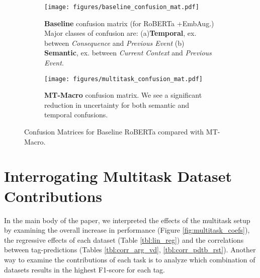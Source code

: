 \documentclass[11pt]{article}
\begin{document}
\begin{figure}[t]
\begin{subfigure}{.5\textwidth}
  \centering
  \texttt{[image: figures/baseline\_confusion\_mat.pdf]}
  \caption{\textbf{Baseline } confusion matrix (for RoBERTa +EmbAug.) Major classes of confusion are: (a)\textbf{Temporal}, ex. between \textit{Consequence} and \textit{Previous Event} (b) \textbf{Semantic}, ex. between \textit{Current Context} and \textit{Previous Event}.}
  \label{sfig:baseline_confusion_mat}
\end{subfigure}
\begin{subfigure}{.5\textwidth}
  \centering
  \texttt{[image: figures/multitask\_confusion\_mat.pdf]}
  \caption{\textbf{MT-Macro} confusion matrix. We see a significant reduction in uncertainty for both semantic and temporal confusions.}
  \label{sfig:multitask_confusion_mat}
\end{subfigure}
\caption{Confusion Matrices for Baseline RoBERTa compared with MT-Macro.}
\label{fig:fig}
\end{figure}

\section{Interrogating Multitask Dataset Contributions}
\label{app:multitask_dataset_contributions}

In the main body of the paper, we interpreted the effects of the multitask setup by examining the overall increase in performance (Figure \ref{fig:multitask_coefs}), the regressive effects of each dataset (Table \ref{tbl:lin_reg}) and the correlations between tag-predictions (Tables \ref{tbl:corr_arg_vd}, \ref{tbl:corr_pdtb_rst}). Another way to examine the contributions of each task is to analyze which combination of datasets results in the highest F1-score for each tag.
\end{document}
